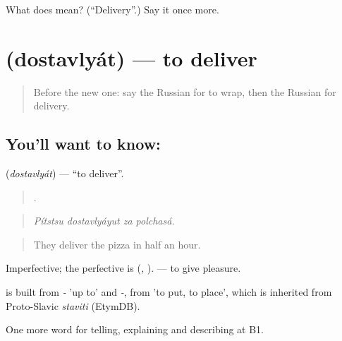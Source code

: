 \begin{tcolorbox}[breakable,colback=teal!4,colframe=teal!35!black,title={Before you move on}]
What does  mean? (\textquotedblleft{}Delivery\textquotedblright{}.) Say it once more.
\end{tcolorbox}
\section[\texorpdfstring{\ru{доставлять} (dostavlyát)}{доставлять (dostavlyát)}]{ (dostavlyát) — to deliver}

\label{lesson:RU-C457-dostavlyat}



\begin{quote}
Before the new one: say the Russian for to wrap, then the Russian for delivery.
\end{quote}

\subsection*{You'll want to know: }
\textbf{} (\emph{dostavlyát}) — \textquotedblleft{}to deliver\textquotedblright{}.

\begin{quote}
   .
\end{quote}

\begin{quote}
\emph{Pítstsu dostavlyáyut za polchasá.}
\end{quote}

\begin{quote}
They deliver the pizza in half an hour.
\end{quote}

Imperfective; the perfective is \emph{} (\emph{, }). \emph{ } — to give pleasure.

\begin{cousinweb}
\emph{} is built from \emph{-} 'up to' and \emph{-}, from \emph{} 'to put, to place', which is inherited from Proto-Slavic \emph{staviti} (EtymDB).
\end{cousinweb}

\begin{grammarlens}[title={What you've built}]
One more word for telling, explaining and describing at B1.
\end{grammarlens}

